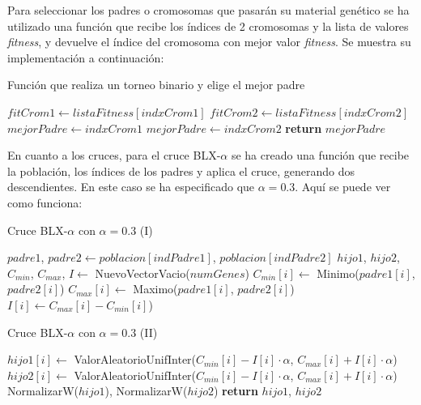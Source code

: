 \documentclass[11pt,a4paper]{article}
\begin{document}
Para seleccionar los padres o cromosomas que pasarán su material genético se ha utilizado una función que recibe los índices
de 2 cromosomas y la lista de valores \textit{fitness}, y devuelve el índice del cromosoma con mejor valor \textit{fitness}.
Se muestra su implementación a continuación:

\begin{algorithm}[H]
\caption{Función que realiza un torneo binario y elige el mejor padre}
\begin{algorithmic}[1]
\State $fitCrom1 \gets listaFitness[indxCrom1]$
\State $fitCrom2 \gets listaFitness[indxCrom2]$
\State $mejorPadre \gets indxCrom1$
	\State $mejorPadre \gets indxCrom2$
\EndIf
\State \textbf{return} $mejorPadre$
\EndFunction
\end{algorithmic}
\end{algorithm}

En cuanto a los cruces, para el cruce BLX-$\alpha$ se ha creado una función que recibe la población, los índices
de los padres y aplica el cruce, generando dos descendientes. En este caso se ha especificado que $\alpha = 0.3$.
Aquí se puede ver como funciona:

\begin{algorithm}[H]
\caption{Cruce BLX-$\alpha$ con $\alpha = 0.3$ (I)}
\begin{algorithmic}[1]
\State $padre1$, $padre2 \gets poblacion[indPadre1]$, $poblacion[indPadre2]$
\State $hijo1$, $hijo2$, $C_{min}$, $C_{max}$, $I \gets$ NuevoVectorVacio($numGenes$)
	\State $C_{min}[i] \gets$ Minimo($padre1[i]$, $padre2[i]$)
	\State $C_{max}[i] \gets$ Maximo($padre1[i]$, $padre2[i]$)
	\State $I[i] \gets C_{max}[i] - C_{min}[i]$)
\EndFor
{}
\end{algorithmic}
\end{algorithm}

\begin{algorithm}[H]
\caption{Cruce BLX-$\alpha$ con $\alpha = 0.3$ (II)}
\begin{algorithmic}[1]
	\State $hijo1[i] \gets$ ValorAleatorioUnifInter($C_{min}[i] - I[i] \cdot \alpha$, $C_{max}[i] + I[i] \cdot \alpha$)
	\State $hijo2[i] \gets$ ValorAleatorioUnifInter($C_{min}[i] - I[i] \cdot \alpha$, $C_{max}[i] + I[i] \cdot \alpha$)
\EndFor
\State NormalizarW($hijo1$), NormalizarW($hijo2$)
\State \textbf{return} $hijo1$, $hijo2$
\EndFunction
\end{algorithmic}
\end{algorithm}
\end{document}
